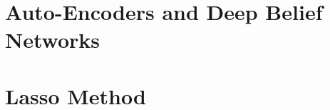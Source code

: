 \documentclass[
10pt, %
a4paper, %
oneside, %
headinclude,footinclude, %
BCOR5mm, %
]{scrartcl}
\begin{document}
\section{Auto-Encoders and Deep Belief Networks}

\section{Lasso Method}







\end{document}
